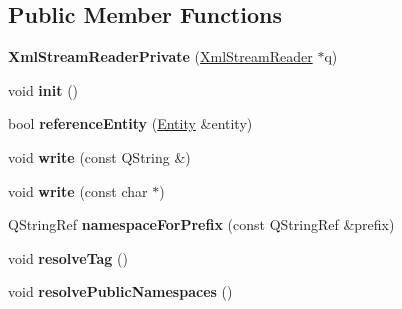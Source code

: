 \subsection*{Public Member Functions}
\begin{DoxyCompactItemize}
\item 
\mbox{\label{class_xml_stream_reader_private_a80c657130148f12e8016f19d642504fc}} 
{\bfseries Xml\+Stream\+Reader\+Private} (\hyperlink{class_xml_stream_reader}{Xml\+Stream\+Reader} $\ast$q)
\item 
\mbox{\label{class_xml_stream_reader_private_ab87909c64d08f90c2525b6339ed97777}} 
void {\bfseries init} ()
\item 
\mbox{\label{class_xml_stream_reader_private_a4afb1c3dd3bd16c4f6f4095693185f79}} 
bool {\bfseries reference\+Entity} (\hyperlink{struct_xml_stream_reader_private_1_1_entity}{Entity} \&entity)
\item 
\mbox{\label{class_xml_stream_reader_private_a400462e7de7c474a1ae4f24c8a1dc072}} 
void {\bfseries write} (const Q\+String \&)
\item 
\mbox{\label{class_xml_stream_reader_private_ac6c8d0e155624cb14246b0f8b417a208}} 
void {\bfseries write} (const char $\ast$)
\item 
\mbox{\label{class_xml_stream_reader_private_ad6a12cfa6d68c1cd673b5f987770ba99}} 
Q\+String\+Ref {\bfseries namespace\+For\+Prefix} (const Q\+String\+Ref \&prefix)
\item 
\mbox{\label{class_xml_stream_reader_private_a986d6916c9e2c9704bff9ae215a11e38}} 
void {\bfseries resolve\+Tag} ()
\item 
\mbox{\label{class_xml_stream_reader_private_a54c3026e6931cb97805c4d246ec08908}} 
void {\bfseries resolve\+Public\+Namespaces} ()
\item 
\mbox{\label{class_xml_stream_reader_private_a4fa74522d55e5bbe8e94ab0de97394a3}} 

\end{DoxyCompactItemize}
